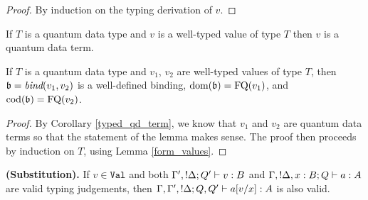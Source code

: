 \documentclass[twoside]{article}
\begin{document}
\begin{proof}
By induction on the typing derivation of $v$.
\end{proof}

\begin{corollary}
\label{typed_qd_term}
If $T$ is a quantum data type and $v$ is a well-typed value of type $T$ then $v$ is 
a quantum data term.
\end{corollary}

\begin{lemma}
\label{bind_qd_terms}
If $T$ is a quantum data type and $v_1$, $v_2$ are well-typed values of 
type $T$, then $\mathfrak{b}=\mathop{\textit{bind}}\nolimits(v_1,v_2)$ is a well-defined binding, $\mathop{\textrm{\rm dom}}\nolimits(\mathfrak{b})=\mathop{\textrm{FQ}}\nolimits(v_1)$, and $\mathop{\textrm{\rm cod}}\nolimits(\mathfrak{b})=\mathop{\textrm{FQ}}\nolimits(v_2)$.
\end{lemma}

\begin{proof}
By Corollary \hyperref[typed_qd_term]{\ref*{typed_qd_term}}, we know that 
$v_1$ and $v_2$ are quantum data terms so that the statement of the lemma 
makes sense. The proof then proceeds by induction on $T$, using Lemma
\hyperref[form_values]{\ref*{form_values}}.
\end{proof}

\begin{lemma}
{\bf (Substitution).}
\label{substitution}
If $v\in\mathtt{Val}$ and both $\Gamma',{!}\Delta;Q' \vdash v:B$ and 
$\Gamma,{!}\Delta,x:B;Q \vdash a:A$ are valid typing judgements, 
then $\Gamma,\Gamma',{!}\Delta;Q,Q' \vdash a[v/x]:A$ is also valid.
\end{lemma}
\end{document}
